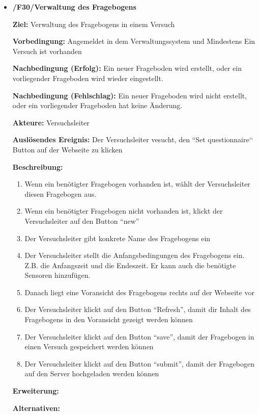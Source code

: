\documentclass[a4paper]{scrreprt}
\begin{document}
\begin{itemize}
                \item \textbf{/F30/Verwaltung des Fragebogens}

                \par \textbf{Ziel: }Verwaltung des Fragebogens in einem Versuch
                \par \textbf{Vorbedingung: }Angemeldet in dem Verwaltungssystem und Mindestens Ein Versuch ist vorhanden 
                \par \textbf{Nachbedingung (Erfolg): }Ein neuer Frageboden wird erstellt, oder ein vorliegender Frageboden wird wieder eingestellt.
                \par \textbf{Nachbedingung (Fehlschlag): }Ein neuer Frageboden wird nicht erstellt, oder ein vorliegender Frageboden hat keine Änderung.
                \par \textbf{Akteure: }Versuchsleiter
                \par \textbf{Auslösendes Ereignis: }Der Versuchsleiter vesucht, den ``Set questionnaire‘‘ Button auf der
Webseite zu klicken

                \par \textbf{Beschreibung: }
                \begin{enumerate}
                    \item Wenn ein benötigter Fragebogen vorhanden ist, wählt der Versuchsleiter diesen Fragebogen aus.
                    \item Wenn ein benötigter Fragebogen nicht vorhanden ist, klickt der Versuchsleiter auf den Button ``new''
                    \item Der Versuchsleiter gibt konkrete Name des Fragebogens ein
                    \item Der Versuchsleiter stellt die Anfangsbedingungen des Fragebogens ein. Z.B. die Anfangszeit und die Endeszeit. Er kann auch die benötigte Sensoren hinzufügen.
                    \item Danach liegt eine Voransicht des Fragebogens rechts auf der Webseite vor
                    \item  Der Versuchsleiter klickt auf den Button ``Refresh'', damit dir Inhalt des Fragebogens in den Voransicht gezeigt werden können
                    \item Der Versuchsleiter klickt auf den Button ``save'', damit der Fragebogen in einen Versuch gespeichert werden können
                    \item Der Versuchsleiter klickt auf den Button ``submit'', damit der Fragebogen auf den Server hochgeladen werden können
                \end{enumerate}
                \par \textbf{Erweiterung: }
                \par \textbf{Alternativen: }



\end{itemize}
\end{document}
